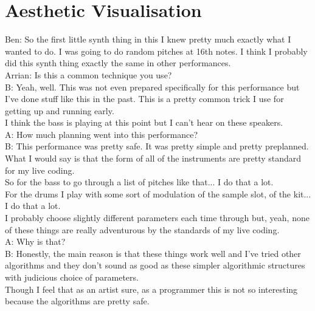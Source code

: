 
\section*{Aesthetic Visualisation}

Ben: So the first little synth thing in this I knew pretty much exactly what I wanted to do. I was going to do random pitches at 16th notes. I think I probably did this synth thing exactly the same in other performances.\\

Arrian: Is this a common technique you use?\\

B: Yeah, well. This was not even prepared specifically for this performance but I've done stuff like this in the past. This is a pretty common trick I use for getting up and running early.\\

I think the bass is playing at this point but I can't hear on these speakers.\\

A: How much planning went into this performance?\\

B: This performance was pretty safe. It was pretty simple and pretty preplanned. What I would say is that the form of all of the instruments are pretty standard for my live coding.\\

So for the bass to go through a list of pitches like that... I do that a lot.\\

For the drums I play with some sort of modulation of the sample slot, of the kit... I do that a lot.\\

I probably choose slightly different parameters each time through but, yeah, none of these things are really adventurous by the standards of my live coding.\\

A: Why is that?\\

B: Honestly, the main reason is that these things work well and I've tried other algorithms and they don't sound as good as these simpler algorithmic structures with judicious choice of parameters.\\

Though I feel that as an artist sure, as a programmer this is not so interesting because the algorithms are pretty safe.\\

